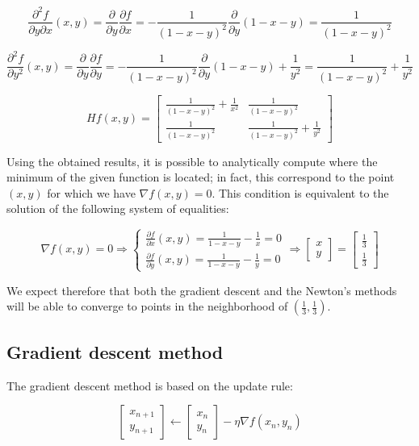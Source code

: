 \documentclass[letterpaper,headings=standardclasses]{scrartcl}
\begin{document}
$$ \frac{\partial^2 f}{\partial y \partial x}(x,y) = \frac{\partial}{\partial y} \frac{\partial f}{\partial x} = - \frac{1}{(1-x-y)^2} \frac{\partial}{\partial y}(1-x-y) = \frac{1}{(1-x-y)^2} $$

$$ \frac{\partial^2 f}{\partial y^2}(x,y) = \frac{\partial}{\partial y} \frac{\partial f}{\partial y} = - \frac{1}{(1-x-y)^2} \frac{\partial}{\partial y}(1-x-y) + \frac{1}{y^2} = \frac{1}{(1-x-y)^2} + \frac{1}{y^2} $$

$$ Hf(x,y) = \left[ \begin{matrix} \frac{1}{(1-x-y)^2} + \frac{1}{x^2} & \frac{1}{(1-x-y)^2} \\[0.5em] \frac{1}{(1-x-y)^2} & \frac{1}{(1-x-y)^2} + \frac{1}{y^2} \end{matrix} \right] $$

Using the obtained results, it is possible to analytically compute where the minimum of the given function is located; in fact, this correspond to the point $(x,y)$ for which we have $\nabla f(x,y) = 0$. This condition is equivalent to the solution of the following system of equalities:

$$ \nabla f(x,y) = 0 \Rightarrow \begin{cases} \frac{\partial f}{\partial x}(x,y) = \frac{1}{1-x-y} -\frac{1}{x} = 0 \\ \frac{\partial f}{\partial y}(x,y) = \frac{1}{1-x-y} -\frac{1}{y} = 0 \end{cases} \Rightarrow \left[ \begin{matrix} x \\ y \end{matrix} \right] = \left[ \begin{matrix} \frac{1}{3} \\[0.5em] \frac{1}{3} \end{matrix} \right] $$

We expect therefore that both the gradient descent and the Newton's methods will be able to converge to points in the neighborhood of $\left( \frac{1}{3}, \frac{1}{3} \right)$.

\subsection{Gradient descent method}

The gradient descent method is based on the update rule:

$$ \left[ \begin{matrix} x_{n+1} \\ y_{n+1} \end{matrix} \right] \leftarrow \left[ \begin{matrix} x_n \\ y_n \end{matrix} \right] - \eta \nabla f(x_n, y_n) $$
\end{document}
